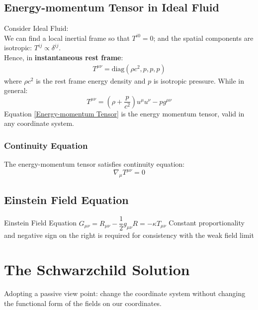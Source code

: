 \documentclass[12pt,a4paper]{article}
\begin{document}
    \subsection{Energy-momentum Tensor in Ideal Fluid}
        Consider Ideal Fluid:\\
        We can find a local inertial frame so that $T^{i0}=0$; and the spatial components are isotropic: $T^{ij}\propto\delta^{ij}$.\\
        Hence, in \textbf{instantaneous rest frame}:
        \begin{align*}
            T^{\mu\nu}= \text{diag}(\rho c^2,p,p,p)
        \end{align*}
        where $\rho c^2$ is the rest frame energy density and $p$ is isotropic pressure.
        While in general:
        \begin{equation}\label{Energy-momentum Tensor}
            T^{\mu\nu}= (\rho+\dfrac{p}{c^2})u^\mu u^\nu - pg^{\mu\nu}
        \end{equation}
        Equation \ref{Energy-momentum Tensor} is the energy momentum tensor, valid in any coordinate system.\\
        \subsubsection{Continuity Equation}
        The energy-momentum tensor satisfies continuity equation:
        \begin{equation*}
            \nabla_\mu T^{\mu\nu} = 0
        \end{equation*}
    \subsection{Einstein Field Equation}
    \begin{definition}
        {Einstein Field Equation}
        {$G_{\mu\nu}=R_{\mu\nu}-\dfrac{1}{2}g_{\mu\nu}R=-\kappa T_{\mu\nu}$}
        {Constant proportionality and negative sign on the right is required for consistency with the weak field limit}
    \end{definition}
\section{The Schwarzchild Solution}
Adopting a passive view point: change the coordinate system without changing the functional form of the fields on our coordinates.
\end{document}
